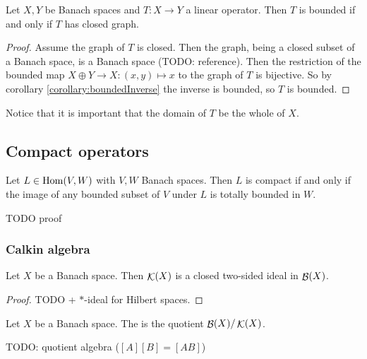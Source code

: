 \begin{theorem} \label{theorem:closedGraphTheorem}
Let $X,Y$ be Banach spaces and $T: X\to Y$ a linear operator. Then $T$ is bounded \textup{if and only if} $T$ has closed graph.
\end{theorem}
\begin{proof}
Assume the graph of $T$ is closed. Then the graph, being a closed subset of a Banach space, is a Banach space (TODO: reference). Then the restriction of the bounded map $X\oplus Y \to X: (x,y)\mapsto x$ to the graph of $T$ is bijective. So by corollary \ref{corollary:boundedInverse} the inverse is bounded, so $T$ is bounded.
\end{proof}
Notice that it is important that the domain of $T$ be the whole of $X$.


\subsection{Compact operators}
\begin{proposition}
Let $L\in\operatorname{Hom}(V,W)$ with $V,W$ Banach spaces. Then $L$ is compact \textup{if and only if} the image of any bounded subset of $V$ under $L$ is totally bounded in $W$.
\end{proposition}
TODO proof



\subsubsection{Calkin algebra}
\begin{proposition}
Let $X$ be a Banach space. Then $\mathop{\mathcal{K}}(X)$ is a closed two-sided ideal in $\mathop{\mathcal{B}}(X)$.
\end{proposition}
\begin{proof}
TODO + $*$-ideal for Hilbert spaces.
\end{proof}

\begin{definition}
Let $X$ be a Banach space. The  is the quotient $\mathop{\mathcal{B}}(X)/\mathop{\mathcal{K}}(X)$.
\end{definition}
TODO: quotient algebra ($[A][B] = [AB]$)

